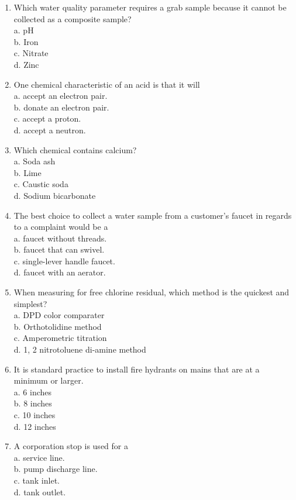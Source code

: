 \documentclass[10pt]{article}
\begin{document}
\begin{enumerate}
  \item Which water quality parameter requires a grab sample because it cannot be collected as a composite sample?\\
a. $\mathrm{pH}$\\
b. Iron\\
c. Nitrate\\
d. Zinc 

	\item One chemical characteristic of an acid is that it will\\
a. accept an electron pair.\\
b. donate an electron pair.\\
c. accept a proton.\\
d. accept a neutron.

  \item Which chemical contains calcium?\\
a. Soda ash\\
b. Lime\\
c. Caustic soda\\
d. Sodium bicarbonate

  \item The best choice to collect a water sample from a customer's faucet in regards to a complaint would be a\\
a. faucet without threads.\\
b. faucet that can swivel.\\
c. single-lever handle faucet.\\
d. faucet with an aerator.

  \item When measuring for free chlorine residual, which method is the quickest and simplest?\\
a. DPD color comparater\\
b. Orthotolidine method\\
c. Amperometric titration\\
d. 1, 2 nitrotoluene di-amine method

  \item It is standard practice to install fire hydrants on mains that are at a minimum or larger.\\
a. 6 inches\\
b. 8 inches\\
c. 10 inches\\
d. 12 inches

  \item A corporation stop is used for a\\
a. service line.\\
b. pump discharge line.\\
c. tank inlet.\\
d. tank outlet.


\end{enumerate}
\end{document}
